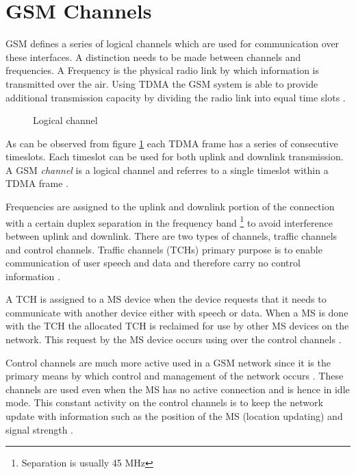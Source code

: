 \section{GSM Channels}
\label{sec:interfacech}
GSM defines a series of logical channels which are used for communication over these interfaces. A distinction needs to be made between channels and frequencies. A Frequency is the physical radio link by which information is transmitted over the air. Using TDMA the GSM system is able to provide additional transmission capacity by dividing the radio link into equal time slots \cite{wirelesstelcoMullet}. 
\begin{figure}[h]
	\begin{centering}
		
		\caption{Logical channel \cite{wirelesstelcoMullet}}
		\label{fig:GSMChannels}
	\end{centering}
\end{figure}
As can be observed from figure \ref{fig:GSMChannels} each TDMA frame has a series of consecutive timeslots. Each timeslot can be used for both uplink and downlink transmission. A GSM \emph{channel} is a logical channel and referres to a single timeslot within a TDMA frame \cite{wirelesstelcoMullet,GSMArchitectureProtocolsServices}.

Frequencies are assigned to the uplink and downlink portion of the connection with a certain duplex separation in the frequency band \footnote{Separation is usually 45 MHz} to avoid interference between uplink and downlink. There are two types of channels, traffic channels and control channels. Traffic channels (TCHs) primary purpose is to enable communication of user speech and data and therefore carry no control information \cite{GSMArchitectureProtocolsServices}.

A TCH is assigned to a MS device when the device requests that it needs to communicate with another device either with speech or data. When a MS is done with the TCH the allocated TCH is reclaimed for use by other MS devices on the network. This request by the MS device occurs using over the control channels \cite{GSMArchitectureProtocolsServices}.

Control channels are much more active used in a GSM network since it is the primary means by which control and management of the network occurs \cite{GSMArchitectureProtocolsServices}. These channels are used even when the MS has no active connection and is hence in idle mode. This constant activity on the control channels is to keep the network update with information such as the position of the MS (location updating) and signal strength \cite{GSMArchitectureProtocolsServices,GSMSysEngin,Eisenblatter}. 

